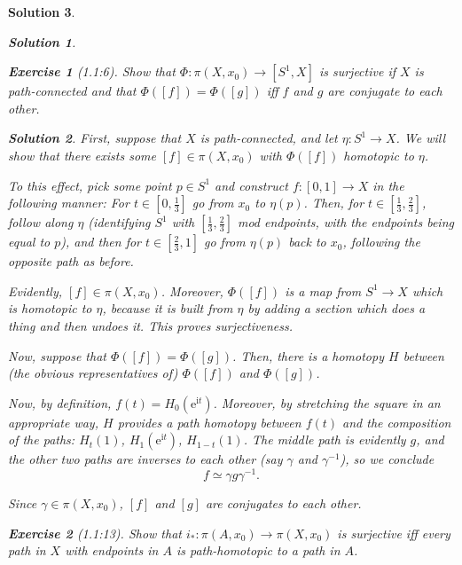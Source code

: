 \documentclass{article}
\theoremstyle{plain}
\newtheorem*{ex}{Exercise}
\theoremstyle{nonumberplain}
\newtheorem{sol}{Solution}
\newcommand{\I}{\mathrm{i}}
\newcommand{\e}{\mathrm{e}}
\begin{document}
\begin{sol}
\begin{sol}

\end{sol}

\begin{ex}[1.1:6]
Show that $\Phi \colon \pi(X,x_0) \to [S^1, X]$ is surjective if $X$ is path-connected and that $\Phi([f]) = \Phi([g])$ iff $f$ and $g$ are conjugate to each other.
\end{ex}

\begin{sol}
First, suppose that $X$ is path-connected, and let $\eta \colon S^1 \to X$. We will show that there exists some $[f] \in \pi(X,x_0)$ with $\Phi([f])$ homotopic to $\eta$.

To this effect, pick some point $p \in S^1$ and construct $f \colon [0,1] \to X$ in the following manner: For $t \in [0,\frac13]$ go from $x_0$ to $\eta(p)$. Then, for $t \in [\frac13,\frac23]$, follow along $\eta$ (identifying $S^1$ with $[\frac13,\frac23]$ mod endpoints, with the endpoints being equal to $p$), and then for $t \in [\frac23,1]$ go from $\eta(p)$ back to $x_0$, following the opposite path as before.

Evidently, $[f] \in \pi(X,x_0)$. Moreover, $\Phi([f])$ is a map from $S^1 \to X$ which is homotopic to $\eta$, because it is built from $\eta$ by adding a section which does a thing and then undoes it. This proves surjectiveness.

\smallskip

Now, suppose that $\Phi([f]) = \Phi([g])$. Then, there is a homotopy $H$ between (the obvious representatives of) $\Phi([f])$ and $\Phi([g])$.

Now, by definition, $f(t) = H_0(\e^{\I t})$. Moreover, by stretching the square in an appropriate way, $H$ provides a path homotopy between $f(t)$ and the composition of the paths: $H_t(1)$, $H_1(\e^{\I t})$, $H_{1-t}(1)$. The middle path is evidently $g$, and the other two paths are inverses to each other (say $\gamma$ and $\gamma^{-1}$), so we conclude
\begin{equation}
f \simeq \gamma g \gamma^{-1}.
\end{equation}

Since $\gamma \in \pi(X,x_0)$, $[f]$ and $[g]$ are conjugates to each other.
\end{sol}

\begin{ex}[1.1:13]
Show that $i_* \colon \pi(A,x_0) \to \pi(X,x_0)$ is surjective iff every path in $X$ with endpoints in $A$ is path-homotopic to a path in $A$.
\end{ex}


\end{sol}
\end{document}
